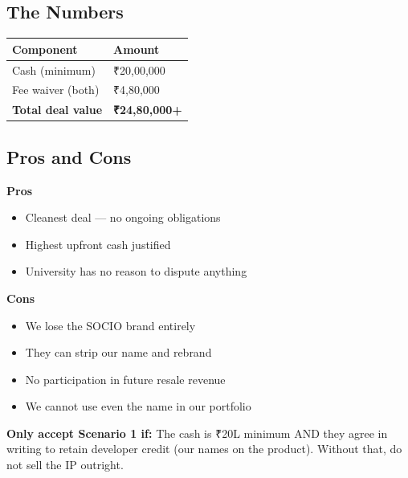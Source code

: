 \documentclass[12pt,a4paper]{article}
\begin{document}
    \subsection*{The Numbers}

    \begin{tabularx}{\textwidth}{L{5cm} X}
    \toprule
    \textbf{Component} & \textbf{Amount} \\
    \midrule
    Cash (minimum) & ₹20,00,000 \\
    Fee waiver (both) & ₹4,80,000 \\
    \textbf{Total deal value} & \textbf{₹24,80,000+} \\
    \bottomrule
    \end{tabularx}

    \subsection*{Pros and Cons}

    \begin{multicols}{2}
    \textbf{\color{green} Pros}
    \begin{itemize}[leftmargin=*, noitemsep]
        \item Cleanest deal — no ongoing obligations
        \item Highest upfront cash justified
        \item University has no reason to dispute anything
    \end{itemize}

    \columnbreak

    \textbf{\color{red} Cons}
    \begin{itemize}[leftmargin=*, noitemsep]
        \item We lose the SOCIO brand entirely
        \item They can strip our name and rebrand
        \item No participation in future resale revenue
        \item We cannot use even the name in our portfolio
    \end{itemize}
    \end{multicols}

    \begin{warnbox}
    \textbf{Only accept Scenario 1 if:} The cash is ₹20L minimum AND they agree in writing to retain developer credit (our names on the product). Without that, do not sell the IP outright.
    \end{warnbox}
\end{document}
